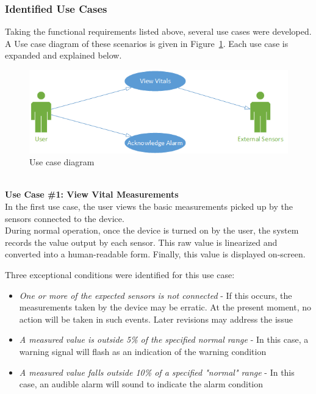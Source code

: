 \documentclass[12pt]{article} %
\begin{document}
\subsubsection{Identified Use Cases}
Taking the functional requirements listed above, several use cases were
developed. A Use case diagram of these scenarios is given in
Figure~\ref{fig:useCases}. Each use case is expanded and explained below.

\begin{figure}[h]
	\centering
	\includegraphics[width=\textwidth]{../design/use_cases_graphical.png}
	\caption{Use case diagram}
	\label{fig:useCases}
\end{figure}

~\\
\textbf{Use Case \#1: View Vital Measurements } \\
In the first use case, the user views the basic measurements picked up by the
sensors connected to the device. \\
During normal operation, once the device is turned on by the user, the system
records the value output by each sensor. This raw value is linearized and 
converted into a human-readable form. Finally, this value is displayed on-screen.

Three exceptional conditions were identified for this use case: 
\begin{itemize}
  \item \emph{One or more of the expected sensors is not connected} - If this occurs, the measurements taken by the device may be erratic. At the present moment, no action will be taken in such events. Later revisions may address the issue
\item \emph{A measured value is outside 5\% of the specified normal range} - In this case, a warning signal will flash as an indication of the warning condition
\item \emph{A measured value falls outside 10\% of a specified "normal" range} - In this case, an audible alarm will sound to indicate the alarm condition
\end{itemize}
\end{document}

